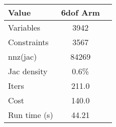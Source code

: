 \begin{tabular}{lcl}
\toprule 
Value & 6dof Arm \\
\midrule 
Variables & 3942 \\
Constraints & 3567 \\
nnz(jac) & 84269 \\
Jac density & 0.6\% \\
Iters & 211.0 \\
Cost & 140.0 \\
Run time (s) & 44.21 \\
\bottomrule 
\end{tabular}
